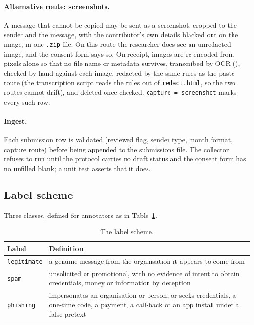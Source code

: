 \paragraph{Alternative route: screenshots.} A message that cannot be copied may be sent as a
screenshot, cropped to the sender and the message, with the contributor's own details blacked
out on the image, in one \texttt{.zip} file. On this route the researcher does see an unredacted
image, and the consent form says so. On receipt, images are re-encoded from pixels alone so that
no file name or metadata survives, transcribed by OCR (), checked by
hand against each image, redacted by the same rules as the paste route (the transcription script
reads the rules out of \texttt{redact.html}, so the two routes cannot drift), and deleted once
checked. \texttt{capture = screenshot} marks every such row.

\paragraph{Ingest.} Each submission row is validated (reviewed flag, sender type, month format,
capture route) before being appended to the submissions file. The collector refuses to run until
the protocol carries no draft status and the consent form has no unfilled blank; a unit test
asserts that it does.

\subsection*{Label scheme}
Three classes, defined for annotators as in Table~\ref{tab:labels}.

\begin{table}[h]
\centering\small
\caption{The label scheme.}
\label{tab:labels}
\begin{tabular}{@{}l p{11.5cm}@{}}
\toprule
Label & Definition \\
\midrule
\texttt{legitimate} & a genuine message from the organisation it appears to come from \\
\texttt{spam} & unsolicited or promotional, with no evidence of intent to obtain credentials, money or information by deception \\
\texttt{phishing} & impersonates an organisation or person, or seeks credentials, a one-time code, a payment, a call-back or an app install under a false pretext \\
\bottomrule
\end{tabular}
\end{table}

